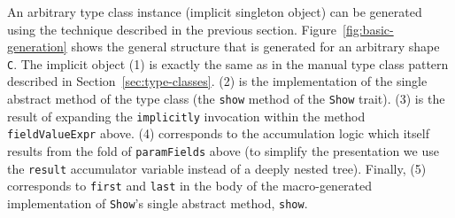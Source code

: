 \documentclass[preprint,nocopyrightspace]{sigplanconf}
\begin{document}
An arbitrary type class instance (implicit singleton object) can be generated
using the technique described in the previous section.
Figure~\ref{fig:basic-generation} shows the general structure that is
generated for an
arbitrary shape \verb|C|. The implicit object (1) is
exactly the same as in the manual type class pattern described in
Section~\ref{sec:type-classes}. (2) is the implementation of the single
abstract method of the type class (the \verb|show| method of the \verb|Show|
trait). (3) is the result of expanding the \verb|implicitly| invocation within
the method \verb|fieldValueExpr| above. (4) corresponds to the
accumulation logic which itself results from the fold of \verb|paramFields| above
(to simplify the presentation we use the \verb|result| accumulator variable instead of a deeply nested tree).
Finally, (5) corresponds to \verb|first| and \verb|last|
in the body of the macro-generated implementation of \verb|Show|'s single
abstract method, \verb|show|.









\end{document}

